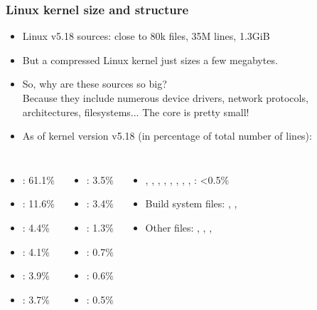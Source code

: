 \begin{frame}
  \frametitle{Linux kernel size and structure}
  \begin{itemize}
  \item Linux v5.18 sources: close to 80k files, 35M lines, 1.3GiB
  \item But a compressed Linux kernel just sizes a few megabytes.
  \item So, why are these sources so big?\\
    Because they include numerous device drivers, network protocols,
    architectures, filesystems... The core is pretty small!
  \item As of kernel version v5.18 (in percentage of total number of lines):
  \end{itemize}
  {\small
  \begin{columns}
    \begin{itemize}
    \item {}: 61.1\%
    \item {}: 11.6\%
    \item {}: 4.4\%
    \item {}: 4.1\%
    \item {}: 3.9\%
    \item {}: 3.7\%
    \end{itemize}
    \begin{itemize}
    \item {}: 3.5\%
    \item {}: 3.4\%
    \item {}: 1.3\%
    \item {}: 0.7\%
    \item {}: 0.6\%
    \item {}: 0.5\%
    \end{itemize}
    \begin{itemize}
    \item {}, , , ,
      , , , , : <0.5\%
    \item Build system files: , , 
    \item Other files: , ,
      , 
    \end{itemize}
  \end{columns}
  }
\end{frame}
